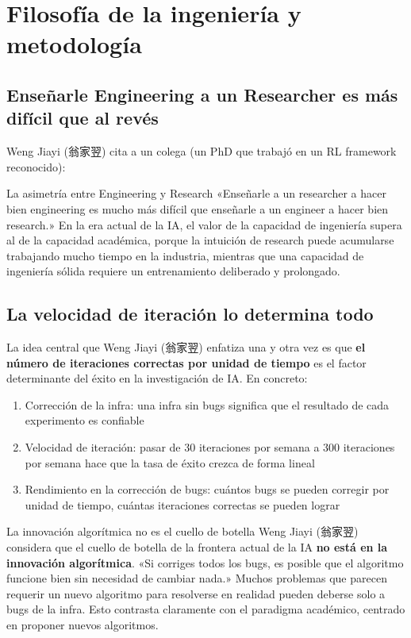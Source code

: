 \section{Filosofía de la ingeniería y metodología}

\subsection{Enseñarle Engineering a un Researcher es más difícil que al revés}

Weng Jiayi (翁家翌) cita a un colega (un PhD que trabajó en un RL framework reconocido):

\begin{importantbox}{La asimetría entre Engineering y Research}
«Enseñarle a un researcher a hacer bien engineering es mucho más difícil que enseñarle a un engineer a hacer bien research.» En la era actual de la IA, el valor de la capacidad de ingeniería supera al de la capacidad académica, porque la intuición de research puede acumularse trabajando mucho tiempo en la industria, mientras que una capacidad de ingeniería sólida requiere un entrenamiento deliberado y prolongado.
\end{importantbox}

\subsection{La velocidad de iteración lo determina todo}

La idea central que Weng Jiayi (翁家翌) enfatiza una y otra vez es que \textbf{el número de iteraciones correctas por unidad de tiempo} es el factor determinante del éxito en la investigación de IA. En concreto:

\begin{enumerate}
    \item Corrección de la infra: una infra sin bugs significa que el resultado de cada experimento es confiable
    \item Velocidad de iteración: pasar de 30 iteraciones por semana a 300 iteraciones por semana hace que la tasa de éxito crezca de forma lineal
    \item Rendimiento en la corrección de bugs: cuántos bugs se pueden corregir por unidad de tiempo, cuántas iteraciones correctas se pueden lograr
\end{enumerate}

\begin{warningbox}{La innovación algorítmica no es el cuello de botella}
Weng Jiayi (翁家翌) considera que el cuello de botella de la frontera actual de la IA \textbf{no está en la innovación algorítmica}. «Si corriges todos los bugs, es posible que el algoritmo funcione bien sin necesidad de cambiar nada.» Muchos problemas que parecen requerir un nuevo algoritmo para resolverse en realidad pueden deberse solo a bugs de la infra. Esto contrasta claramente con el paradigma académico, centrado en proponer nuevos algoritmos.
\end{warningbox}

